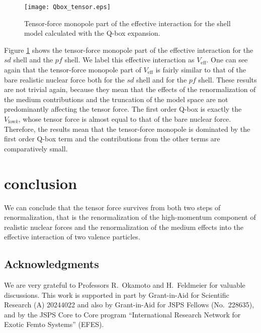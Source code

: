 \documentclass[a4paper]{jpconf}
\newcommand\Veff{V_{\mathrm{eff}}}
\newcommand\Vlowk{V_{\mathrm{low}k}}
\begin{document}
   \begin{figure}[h]
    \texttt{[image: Qbox\_tensor.eps]}\hspace{2pc}%
    \begin{minipage}[b]{14pc}\caption{\label{fig:Qbox_ten}
     Tensor-force monopole part of the effective interaction for the shell model
     calculated with the Q-box expansion.}
    \end{minipage}
   \end{figure}


 Figure \ref{fig:Qbox_ten} shows the tensor-force monopole part of the effective
 interaction for the $sd$ shell and the $pf$ shell. We label this
 effective interaction as $\Veff$.
 One can see again that the tensor-force monopole part of $\Veff$ is fairly similar to that of
 the bare realistic nuclear force both for the $sd$ shell and for the $pf$ shell.
 These results are not trivial again, because they mean that the effects
 of the renormalization of the medium contributions and the truncation of the
 model space are not predominantly affecting the tensor force.
 The first order Q-box is exactly the $\Vlowk$, whose tensor force is
 almost equal to that of the bare nuclear force.
 Therefore, the results mean that the tensor-force monopole is dominated by
 the first order Q-box term and the contributions from the other terms are
 comparatively small.

 \section{conclusion}
 We can conclude that the tensor force survives from both two steps of 
 renormalization, that is the renormalization of the high-momentum component of
 realistic nuclear forces and  the 
 renormalization of the medium effects into the effective interaction of 
 two valence particles.

  \subsection{Acknowledgments}

  We are very grateful to Professors R.~Okamoto and H.~Feldmeier
  for valuable discussions.
  This work is supported in part by Grant-in-Aid for Scientific
  Research (A) 20244022 and also by Grant-in-Aid for 
  JSPS Fellows (No.~228635), and by the JSPS Core to Core 
  program ``International Research Network for Exotic Femto Systems''
  (EFES).
\end{document}
